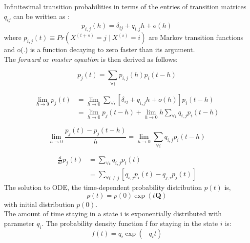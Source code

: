 \documentclass[]{article}
\begin{document}
Infinitesimal transition probabilities in terms of the entries of transition matrices $ q_{ij} $ can be written as \cite{Cohn2010a}:
\begin{equation}
p_{i,j}(h)=\delta_{ij}+q_{i,j} h+o(h)
\end{equation}
where $ p_{i, j}(t) \equiv Pr(X^{(t+s)}=j\mid X^{(s)}=i) $ are Markov transition functions and o(.) is a function decaying to zero faster than its argument.\\

The \textit{forward} or \textit{master equation} is then derived as follows:

\begin{equation}
p_{j}(t)=\sum_{\forall i} p_{i, j}(h) p_{i}(t-h)
\end{equation}

\begin{equation}
\begin{split}
\lim_{h\rightarrow 0} p_{j}(t) & = \lim_{h\rightarrow 0} \sum_{\forall i} \left[ \delta_{ij}+q_{i,j} h+o(h)\right]  p_{i}(t-h) \\ & = \lim_{h\rightarrow 0} p_{j}(t-h) + \lim_{h\rightarrow 0} h \sum_{\forall i} q_{i,j} p_{i}(t-h)
\end{split}
\end{equation}

\begin{equation}
\lim_{h\rightarrow 0} \frac{p_{j}(t) - p_{j}(t-h)}{h} = \lim_{h\rightarrow 0} \sum_{\forall i} q_{i,j} p_{i}(t-h)
\end{equation}

\begin{equation}
\begin{split}
\frac{d}{dt} p_{j}(t) & = \sum_{\forall i} q_{i,j} p_{i}(t) \\ & = \sum_{\forall i \neq j}\left[  q_{i,j} p_{i}(t) - q_{j,i} p_{j}(t) \right]
\end{split}
\end{equation}
The solution to ODE, the time-dependent probability distribution $ p(t) $ is, 
\begin{equation}
p(t)=p(0) \exp (t\textbf{Q})
\end{equation}
with initial distribution $ p(0) $.\\

The amount of time staying in a state i is exponentially distributed with parameter $ q_{i} $. The probability density function f for staying in the state $ i $ is:
\begin{equation}
f(t)=q_{i} \exp \left(-q_{i} t\right)
\end{equation}
\end{document}
